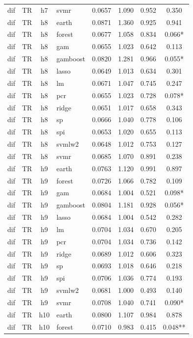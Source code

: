 \begin{ThreePartTable}
\begin{longtable}[t]{llclcccc}
dif & TR & h7 & svmr & 0.0657 & 1.090 & 0.952 & 0.350\\
\addlinespace
dif & TR & h8 & earth & 0.0871 & 1.360 & 0.925 & 0.941\\
dif & TR & h8 & forest & 0.0677 & 1.058 & 0.834 & 0.066*\\
dif & TR & h8 & gam & 0.0655 & 1.023 & 0.642 & 0.113\\
dif & TR & h8 & gamboost & 0.0820 & 1.281 & 0.966 & 0.055*\\
dif & TR & h8 & lasso & 0.0649 & 1.013 & 0.634 & 0.301\\
dif & TR & h8 & lm & 0.0671 & 1.047 & 0.745 & 0.247\\
dif & TR & h8 & pcr & 0.0655 & 1.023 & 0.728 & 0.078*\\
dif & TR & h8 & ridge & 0.0651 & 1.017 & 0.658 & 0.343\\
dif & TR & h8 & sp & 0.0666 & 1.040 & 0.778 & 0.106\\
dif & TR & h8 & spi & 0.0653 & 1.020 & 0.655 & 0.113\\
dif & TR & h8 & svmlw2 & 0.0648 & 1.012 & 0.753 & 0.127\\
dif & TR & h8 & svmr & 0.0685 & 1.070 & 0.891 & 0.238\\
\addlinespace
dif & TR & h9 & earth & 0.0763 & 1.120 & 0.991 & 0.897\\
dif & TR & h9 & forest & 0.0726 & 1.066 & 0.782 & 0.109\\
dif & TR & h9 & gam & 0.0684 & 1.004 & 0.521 & 0.098*\\
dif & TR & h9 & gamboost & 0.0804 & 1.181 & 0.928 & 0.056*\\
dif & TR & h9 & lasso & 0.0684 & 1.004 & 0.542 & 0.282\\
dif & TR & h9 & lm & 0.0704 & 1.034 & 0.670 & 0.205\\
dif & TR & h9 & pcr & 0.0704 & 1.034 & 0.736 & 0.142\\
dif & TR & h9 & ridge & 0.0689 & 1.012 & 0.606 & 0.323\\
dif & TR & h9 & sp & 0.0693 & 1.018 & 0.646 & 0.218\\
dif & TR & h9 & spi & 0.0706 & 1.036 & 0.774 & 0.193\\
dif & TR & h9 & svmlw2 & 0.0681 & 1.000 & 0.493 & 0.140\\
dif & TR & h9 & svmr & 0.0708 & 1.040 & 0.741 & 0.090*\\
\addlinespace
dif & TR & h10 & earth & 0.0800 & 1.107 & 0.984 & 0.878\\
dif & TR & h10 & forest & 0.0710 & 0.983 & 0.415 & 0.048**\\

\end{longtable}
\end{ThreePartTable}
